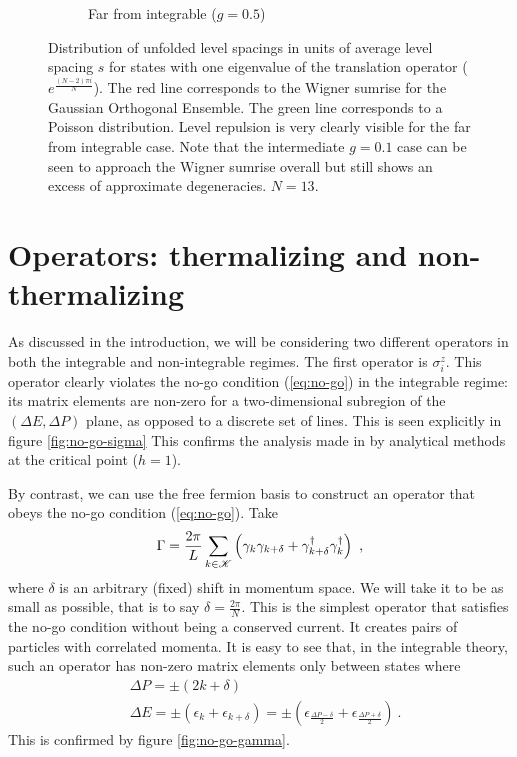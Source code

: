 \begin{figure}
\begin{subfigure}[t]{0.33\textwidth}
\caption{Far from integrable ($g=0.5$)}
\end{subfigure}
\caption{Distribution of unfolded level spacings in units of average level spacing $s$ for states with one eigenvalue of the translation operator ($e^{\frac{(N-2)\pi i}{N}}$). The red line corresponds to the Wigner sumrise for the Gaussian Orthogonal Ensemble. The green line corresponds to a Poisson distribution. Level repulsion is very clearly visible for the far from integrable case. Note that the intermediate $g=0.1$ case  can be seen to approach  the Wigner sumrise overall but still shows an excess of approximate degeneracies. $N=13$.} 
\label{fig:level-stats}
\end{figure}


\section{Operators: thermalizing and non-thermalizing}
As discussed in the introduction, we will be considering two different operators in both the integrable and non-integrable regimes. The first operator is $\sigma^z_i$. This operator clearly violates the no-go condition (\ref{eq:no-go}) in the integrable regime: its matrix elements are non-zero for a two-dimensional subregion of the $(\Delta E,\Delta P)$ plane, as opposed to a discrete set of lines. This is seen explicitly in figure \ref{fig:no-go-sigma} This confirms the analysis made in \cite{Sabella-Garnier:2019tsi} by analytical methods at the critical point ($h=1$).

By contrast, we can use the free fermion basis to construct an operator that obeys the no-go condition (\ref{eq:no-go}). Take 
\begin{equation}
\Gamma=\frac{2\pi}{L}\sum_{k \in \mathcal{K}} \left(\gamma_k \gamma_{k+\delta} +  \gamma^\dagger_{k+\delta} \gamma^\dagger_k\right)~,
\end{equation}
where $\delta$ is an arbitrary (fixed) shift in momentum space. We will take it to be as small as possible, that is to say $\delta=\frac{2\pi}{N}$. This is the simplest operator that satisfies the no-go condition without being a conserved current. It creates pairs of particles with correlated momenta. It is easy to see that, in the integrable theory, such an operator has non-zero matrix elements only between states where
\begin{align}
&\Delta P= \pm (2k+\delta) \\
&\Delta E=\pm(\epsilon_k+\epsilon_{k+\delta})=\pm\left(\epsilon_{\frac{\Delta P-\delta}{2}}+\epsilon_{\frac{\Delta P+\delta}{2}}\right)~.
\end{align}
This is confirmed by figure \ref{fig:no-go-gamma}.

